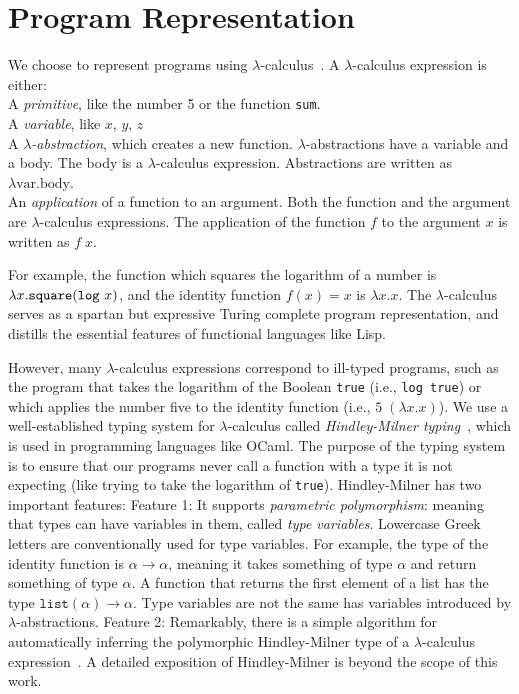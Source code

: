 \documentclass{article}
\begin{document}
\section{Program Representation}
We choose to represent programs using $\lambda$-calculus~\cite{pierce}.
A $\lambda$-calculus expression is either:
\\\noindent A \emph{primitive}, like the number 5 or
  the function \texttt{sum}.
\\\noindent A \emph{variable}, like $x$, $y$, $z$
\\\noindent A $\lambda$\emph{-abstraction}, which creates a new function. $\lambda$-abstractions have a variable and a body. The body is a $\lambda$-calculus expression. Abstractions are written as $\lambda \text{var}. \text{body}$.
\\\noindent An \emph{application} of a function to an argument. Both the function and the argument are $\lambda$-calculus expressions. The application of the function $f$ to the argument $x$ is written as $f\; x$.

For example, the function which squares the logarithm of a number is
$\lambda x.\text{\texttt{square}} (\text{\texttt{log} } x)$, and the identity function $f(x) = x$ is $\lambda x.x$. The
$\lambda$-calculus serves as a spartan but expressive Turing complete
program representation, and distills the essential features of functional languages like Lisp.

However, many $\lambda$-calculus expressions correspond to ill-typed programs, such as the program that takes the logarithm of the Boolean \texttt{true} (i.e., \texttt{log true}) or which applies the number five to the identity function
(i.e., $5 \; (\lambda x.x)$).
We use a well-established typing system for $\lambda$-calculus called \emph{Hindley-Milner typing}~\cite{pierce}, which is used in programming languages like OCaml.
The purpose of the typing system is to ensure that our programs never call a function with a type it is not expecting (like trying to take the logarithm of \texttt{true}).
Hindley-Milner has two important features:
Feature 1: It supports \emph{parametric polymorphism}: meaning that types can have variables in them, called \emph{type variables}. Lowercase Greek letters are conventionally used for  type variables.
For example, the type of the identity function is $\alpha\to\alpha$, meaning it takes something of type $\alpha$ and return something of type $\alpha$. A function that returns the first element of a list has the type $\texttt{list}(\alpha)\to\alpha$. Type variables are not the same has variables introduced by $\lambda$-abstractions.
Feature 2: Remarkably, there is a  simple algorithm for automatically inferring the polymorphic Hindley-Milner type of a $\lambda$-calculus expression~\cite{damas1982principal}.
A detailed exposition of Hindley-Milner is beyond the scope of this work.
\end{document}

